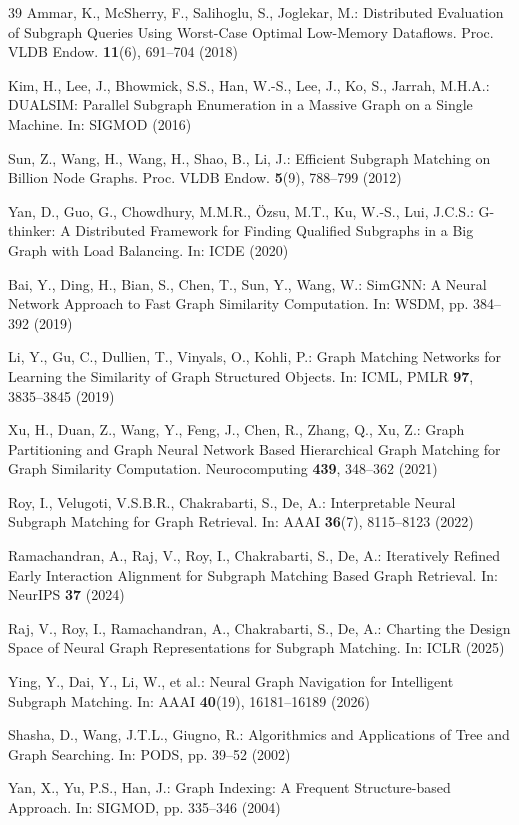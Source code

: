 \documentclass[runningheads]{llncs}
\begin{document}
\begin{thebibliography}{39}
Ammar, K., McSherry, F., Salihoglu, S., Joglekar, M.: Distributed Evaluation of Subgraph Queries Using Worst-Case Optimal Low-Memory Dataflows. Proc. VLDB Endow. \textbf{11}(6), 691--704 (2018)

Kim, H., Lee, J., Bhowmick, S.S., Han, W.-S., Lee, J., Ko, S., Jarrah, M.H.A.: DUALSIM: Parallel Subgraph Enumeration in a Massive Graph on a Single Machine. In: SIGMOD (2016)

Sun, Z., Wang, H., Wang, H., Shao, B., Li, J.: Efficient Subgraph Matching on Billion Node Graphs. Proc. VLDB Endow. \textbf{5}(9), 788--799 (2012)

Yan, D., Guo, G., Chowdhury, M.M.R., \"{O}zsu, M.T., Ku, W.-S., Lui, J.C.S.: G-thinker: A Distributed Framework for Finding Qualified Subgraphs in a Big Graph with Load Balancing. In: ICDE (2020)

Bai, Y., Ding, H., Bian, S., Chen, T., Sun, Y., Wang, W.: SimGNN: A Neural Network Approach to Fast Graph Similarity Computation. In: WSDM, pp. 384--392 (2019)

Li, Y., Gu, C., Dullien, T., Vinyals, O., Kohli, P.: Graph Matching Networks for Learning the Similarity of Graph Structured Objects. In: ICML, PMLR \textbf{97}, 3835--3845 (2019)

Xu, H., Duan, Z., Wang, Y., Feng, J., Chen, R., Zhang, Q., Xu, Z.: Graph Partitioning and Graph Neural Network Based Hierarchical Graph Matching for Graph Similarity Computation. Neurocomputing \textbf{439}, 348--362 (2021)

Roy, I., Velugoti, V.S.B.R., Chakrabarti, S., De, A.: Interpretable Neural Subgraph Matching for Graph Retrieval. In: AAAI \textbf{36}(7), 8115--8123 (2022)

Ramachandran, A., Raj, V., Roy, I., Chakrabarti, S., De, A.: Iteratively Refined Early Interaction Alignment for Subgraph Matching Based Graph Retrieval. In: NeurIPS \textbf{37} (2024)

Raj, V., Roy, I., Ramachandran, A., Chakrabarti, S., De, A.: Charting the Design Space of Neural Graph Representations for Subgraph Matching. In: ICLR (2025)

Ying, Y., Dai, Y., Li, W., et al.: Neural Graph Navigation for Intelligent Subgraph Matching. In: AAAI \textbf{40}(19), 16181--16189 (2026)

Shasha, D., Wang, J.T.L., Giugno, R.: Algorithmics and Applications of Tree and Graph Searching. In: PODS, pp. 39--52 (2002)

Yan, X., Yu, P.S., Han, J.: Graph Indexing: A Frequent Structure-based Approach. In: SIGMOD, pp. 335--346 (2004)

\end{thebibliography}
\end{document}
